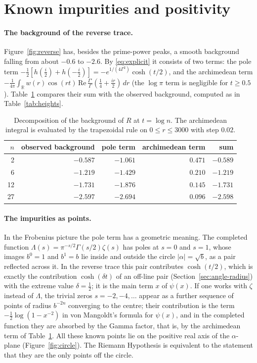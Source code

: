 \documentclass[11pt,a4paper]{article}
\theoremstyle{definition}\newtheorem{definition}[proposition]{Definition}
\theoremstyle{remark}\newtheorem{remark}[proposition]{Remark}
\newcommand{\R}{\mathbb R}\newcommand{\C}{\mathbb C}\newcommand{\Z}{\mathbb Z}
\begin{document}
\section{Known impurities and positivity}\label{sec:impurities}
\paragraph{The background of the reverse trace.} Figure~\ref{fig:reverse} has, besides the prime-power peaks, a smooth background falling from about $-0.6$ to $-2.6$. By \eqref{eq:explicit} it consists of two terms: the pole term $-\tfrac12[h(\tfrac i2)+h(-\tfrac i2)]=-e^{1/(4\Gamma^2)}\cosh(t/2)$, and the archimedean term $-\frac1{4\pi}\int_\R w(r)\cos(rt)\,\mathrm{Re}\,\frac{\Gamma'}{\Gamma}(\frac14+\frac{ir}2)\,dr$ (the $\log\pi$ term is negligible for $t\ge0.5$). Table~\ref{tab:background} compares their sum with the observed background, computed as in Table~\ref{tab:heights}.

\begin{table}[ht]
\centering\small
\begin{tabular}{rrrrr}
\toprule
$n$ & observed background & pole term & archimedean term & sum\\
\midrule
2 & $-0.587$ & $-1.061$ & $0.471$ & $-0.589$\\
6 & $-1.219$ & $-1.429$ & $0.210$ & $-1.219$\\
12 & $-1.731$ & $-1.876$ & $0.145$ & $-1.731$\\
27 & $-2.597$ & $-2.694$ & $0.096$ & $-2.598$\\
\bottomrule
\end{tabular}
\caption{Decomposition of the background of $R$ at $t=\log n$. The archimedean integral is evaluated by the trapezoidal rule on $0\le r\le3000$ with step $0.02$.}\label{tab:background}
\end{table}

\paragraph{The impurities as points.} In the Frobenius picture the pole term has a geometric meaning. The completed function $\Lambda(s)=\pi^{-s/2}\Gamma(s/2)\zeta(s)$ has poles at $s=0$ and $s=1$, whose images $b^0=1$ and $b^1=b$ lie inside and outside the circle $|\alpha|=\sqrt b$, as a pair reflected across it. In the reverse trace this pair contributes $\cosh(t/2)$, which is exactly the contribution $\cosh(\delta t)$ of an off-line pair (Section~\ref{sec:angle-radius}) with the extreme value $\delta=\tfrac12$; it is the main term $x$ of $\psi(x)$. If one works with $\zeta$ instead of $\Lambda$, the trivial zeros $s=-2,-4,\dots$ appear as a further sequence of points of radius $b^{-2n}$ converging to the centre; their contribution is the term $-\tfrac12\log(1-x^{-2})$ in von Mangoldt's formula for $\psi(x)$, and in the completed function they are absorbed by the Gamma factor, that is, by the archimedean term of Table~\ref{tab:background}. All these known points lie on the positive real axis of the $\alpha$-plane (Figure~\ref{fig:circle}). The Riemann Hypothesis is equivalent to the statement that they are the only points off the circle.
\end{document}
